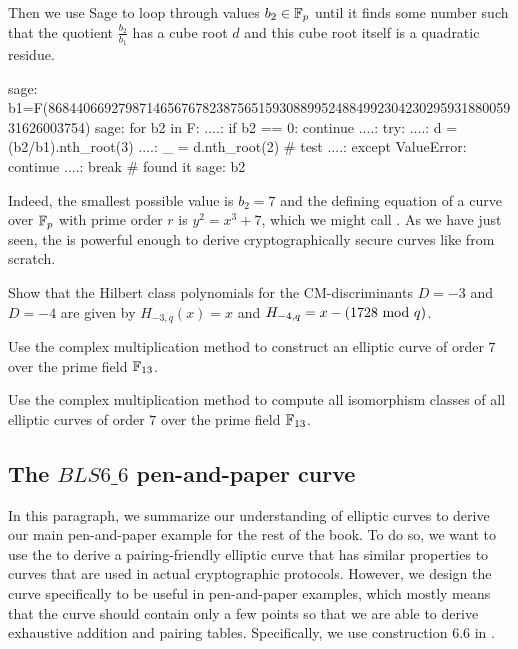 \begin{example}
Then we use Sage to loop through values $b_2\in \mathbb{F}_p$ until it finds some number such that the quotient $\frac{b_2}{b_1}$ has a cube root $d$ and this cube root itself is a quadratic residue. 
\begin{sagecommandline}
sage: b1=F(86844066927987146567678238756515930889952488499230423029593188005931626003754)
sage: for b2 in F:
....:     if b2 == 0: continue
....:     try:
....:         d = (b2/b1).nth_root(3)
....:         _ = d.nth_root(2) # test
....:     except ValueError: continue
....:     break # found it
sage: b2
\end{sagecommandline}
Indeed, the smallest possible value is $b_2=7$ and the defining  equation of a curve over $\mathbb{F}_p$ with prime order $r$ is 
$
y^2 = x^3 + 7
$,
which we might call . As we have just seen, the  is powerful enough to derive cryptographically secure curves like  from scratch.
\end{example}
\begin{exercise}
\label{ex:Low_order_Hilbert_polys} Show that the Hilbert class polynomials for the CM-discriminants $D=-3$ and $D=-4$ are given by  $H_{-3,q}(x)=x$ and $H_{-4,q}= x-(1728 \text{ mod } q)$.
\end{exercise}
\begin{exercise}
Use the complex multiplication method to construct an elliptic curve of order $7$ over the prime field $\mathbb{F}_{13}$.
\end{exercise}
\begin{exercise}
Use the complex multiplication method to compute all isomorphism classes of all elliptic curves of order $7$ over the prime field $\mathbb{F}_{13}$.
\end{exercise}
\subsection{The $BLS6\_6$ pen-and-paper curve}\label{BLS6}

In this paragraph, we summarize our understanding of elliptic curves to derive our main pen-and-paper example for the rest of the book. To do so, we want to use the  to derive a pairing-friendly elliptic curve that has similar properties to curves that are used in actual cryptographic protocols. However, we design the curve specifically to be useful in pen-and-paper examples, which mostly means that the curve should contain only a few points so that we are able to derive exhaustive addition and pairing tables. Specifically, we use construction 6.6 in \cite{freeman-2020}.

